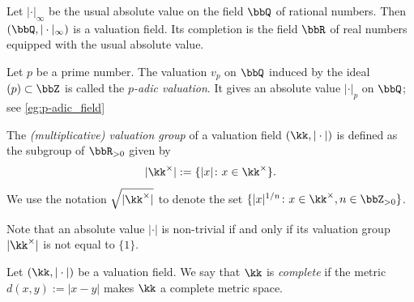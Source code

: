     \begin{example}\label{eg:usual_absolute_value_on_Q}
        Let \(|\cdot|_\infty\) be the usual absolute value on the field \(\bbQ\) of rational numbers.
        Then \((\bbQ, |\cdot|_\infty)\) is a valuation field.
        Its completion is the field \(\bbR\) of real numbers equipped with the usual absolute value.
    \end{example}

    \begin{example}\label{eg:p-adic_absolute_value_on_Q}
        Let \(p\) be a prime number.
        The valuation \(v_p\) on \(\bbQ\) induced by the ideal \((p) \subset \bbZ\) is called the \emph{\(p\)-adic valuation}.
        It gives an absolute value \(|\cdot|_p\) on \(\bbQ\); see \cref{eg:p-adic_field}
    \end{example}

    \begin{definition}\label{def:valuation_group_of_a_valuation_field}
        The \emph{(multiplicative) valuation group} of a valuation field \((\kk,|\cdot|)\) is defined as the subgroup of \(\bbR_{>0}\) given by
        \[ |\kk^\times| := \{|x|\colon x \in \kk^\times\}. \]
        We use the notation \(\sqrt{|\kk^\times|}\) to denote the set \(\{|x|^{1/n}\colon x \in \kk^\times, n \in \bbZ_{>0}\}\).
    \end{definition}

    Note that an absolute value \(|\cdot|\) is non-trivial if and only if its valuation group \(|\kk^\times|\) is not equal to \(\{1\}\).

    \begin{definition}\label{def:complete_valuation_field}
        Let \((\kk,|\cdot|)\) be a valuation field.
        We say that \(\kk\) is \emph{complete} if the metric \(d(x,y) := |x - y|\) makes \(\kk\) a complete metric space.
    \end{definition}

